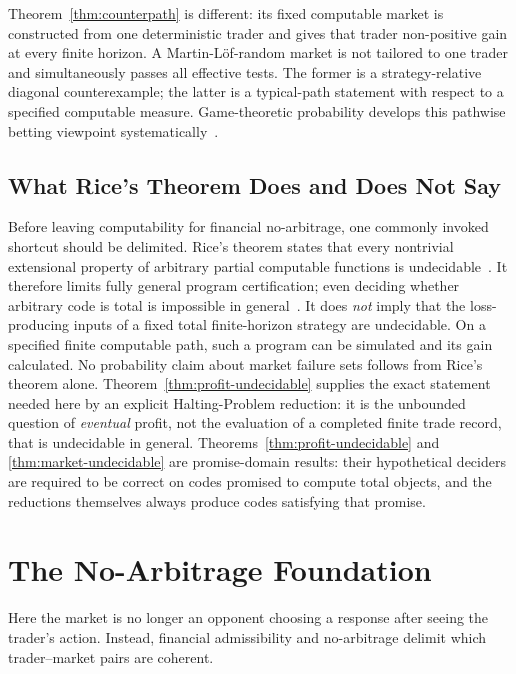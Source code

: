 \documentclass[aps,pra,reprint,superscriptaddress,amsmath,amssymb,floatfix]{revtex4-2}
\theoremstyle{plain}
\theoremstyle{definition}
\theoremstyle{remark}
\begin{document}
Theorem~\ref{thm:counterpath} is different: its fixed computable market is
constructed from one deterministic trader and gives that trader non-positive
gain at every finite horizon. A Martin-L\"of-random market is not tailored to
one trader and simultaneously passes all effective tests. The former is a
strategy-relative diagonal counterexample; the latter is a typical-path
statement with respect to a specified computable measure. Game-theoretic
probability develops this pathwise betting viewpoint
systematically~\cite{ShaferVovk2001}.

\subsection{What Rice's Theorem Does and Does Not Say}

Before leaving computability for financial no-arbitrage, one commonly invoked
shortcut should be delimited.
Rice's theorem states that every nontrivial extensional property of arbitrary
partial computable functions is undecidable~\cite{Rice-1953}. It therefore
limits fully general program certification; even deciding whether arbitrary
code is total is impossible in general~\cite{turing-36}. It does \emph{not}
imply that the loss-producing inputs of a fixed total finite-horizon strategy
are undecidable. On a specified finite computable path, such a program can be
simulated and its gain calculated. No probability claim about market failure
sets follows from Rice's theorem alone. Theorem~\ref{thm:profit-undecidable}
supplies the exact statement needed here by an explicit Halting-Problem
reduction: it is the unbounded question of \emph{eventual} profit, not the
evaluation of a completed finite trade record, that is undecidable in general.
Theorems~\ref{thm:profit-undecidable} and
\ref{thm:market-undecidable} are promise-domain results: their hypothetical
deciders are required to be correct on codes promised to compute total
objects, and the reductions themselves always produce codes satisfying that
promise.

\section{The No-Arbitrage Foundation}
\label{sec:noarb}

Here the market is no longer an opponent choosing a response after seeing the
trader's action. Instead, financial admissibility and no-arbitrage delimit
which trader--market pairs are coherent.
\end{document}
